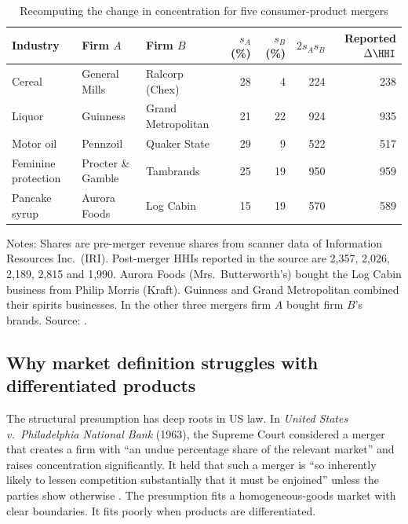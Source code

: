 \begin{table}[htbp]
\centering
\caption{Recomputing the change in concentration for five consumer-product mergers}
\label{tab:11-ahhhi}
\footnotesize
\begin{tabular}{@{}lllrrrr@{}}
\toprule
Industry & Firm $A$ & Firm $B$ & $s_A$ (\%) & $s_B$ (\%) & $2 s_A s_B$ & \makecell{Reported\\$\Delta\HHI$} \\
\midrule
Cereal & General Mills & Ralcorp (Chex) & 28 & 4 & 224 & 238 \\
Liquor & Guinness & Grand Metropolitan & 21 & 22 & 924 & 935 \\
Motor oil & Pennzoil & Quaker State & 29 & 9 & 522 & 517 \\
Feminine protection & Procter \& Gamble & Tambrands & 25 & 19 & 950 & 959 \\
Pancake syrup & Aurora Foods & Log Cabin & 15 & 19 & 570 & 589 \\
\bottomrule
\end{tabular}

\vspace{3pt}
\begin{minipage}{0.97\textwidth}
\footnotesize Notes: Shares are pre-merger revenue shares from scanner data of Information Resources Inc.\ (IRI). Post-merger HHIs reported in
the source are 2,357, 2,026, 2,189, 2,815 and 1,990. Aurora Foods (Mrs.\ Butterworth's) bought the Log Cabin
business from Philip Morris (Kraft). Guinness and Grand Metropolitan combined their spirits businesses. In the other
three mergers firm $A$ bought firm $B$'s brands. Source: \citet[Table 2]{AshenfelterHosken2008}.
\end{minipage}
\end{table}

\subsection{Why market definition struggles with differentiated products}\label{sec:11-diffmarkets}

The structural presumption has deep roots in US law. In \emph{United States v.\ Philadelphia National Bank}
(1963), the Supreme Court considered a merger that creates a firm with ``an undue percentage share of the
relevant market'' and raises concentration significantly. It held that such a merger is ``so inherently
likely to lessen competition substantially that it must be enjoined'' unless the parties show otherwise
\citep[p.~4]{FarrellShapiro2010}. The
presumption fits a homogeneous-goods market with clear boundaries. It fits poorly when products are
differentiated.

